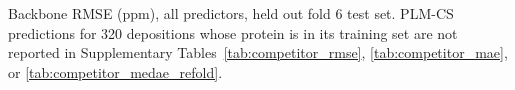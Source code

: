 Backbone RMSE (ppm), all predictors, held out fold 6 test set. PLM-CS predictions for 320 depositions whose protein is in its training set are not reported in Supplementary Tables~\ref{tab:competitor_rmse}, \ref{tab:competitor_mae}, or \ref{tab:competitor_medae_refold}.
